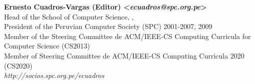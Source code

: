 \begin{center}
\textbf{Ernesto Cuadros-Vargas (Editor) <\textit{ecuadros@spc.org.pe}>}\\ 
Head of the School of Computer Science, \University, \city\\
President of the Peruvian Computer Society (SPC) 2001-2007, 2009\\
Member of the Steering Committee de ACM/IEEE-CS Computing Curricula for Computer Science (CS2013)\\
Member of Steering Committee de ACM/IEEE-CS Computing Curricula 2020 (CS2020)\\
\textit{http://socios.spc.org.pe/ecuadros}
\end{center}